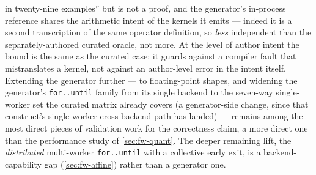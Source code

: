 in twenty-nine examples'' but is not a proof, and the generator's in-process
reference shares the arithmetic intent of the kernels it emits --- indeed it is a
second transcription of the same operator definition, so \emph{less} independent than
the separately-authored curated oracle, not more. At the level of author intent the
bound is the same as the curated case: it guards against a compiler fault that
mistranslates a kernel, not against an author-level error in the intent itself.
Extending the
generator further --- to floating-point shapes, and widening the generator's
\texttt{for..until} family from its single backend to the seven-way single-worker set
the curated matrix already covers (a generator-side change, since that construct's
single-worker cross-backend path has landed) --- remains among the most direct pieces of
validation work for the correctness claim, a more direct one than the performance study
of \cref{sec:fw-quant}. The deeper remaining lift, the \emph{distributed} multi-worker
\texttt{for..until} with a collective early exit, is a backend-capability gap (\cref{sec:fw-affine})
rather than a generator one.

